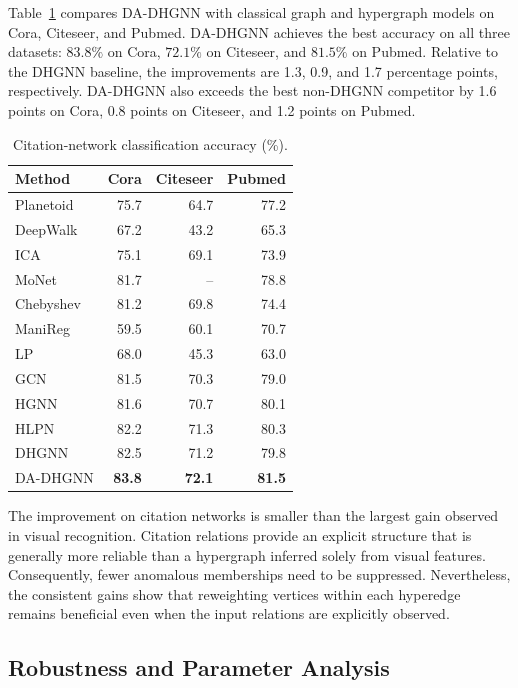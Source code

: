 Table~\ref{tab:citation-main-results} compares DA-DHGNN with classical graph
and hypergraph models on Cora, Citeseer, and Pubmed. DA-DHGNN achieves the best
accuracy on all three datasets: $83.8\%$ on Cora, $72.1\%$ on Citeseer, and
$81.5\%$ on Pubmed. Relative to the DHGNN baseline, the improvements are 1.3,
0.9, and 1.7 percentage points, respectively. DA-DHGNN also exceeds the best
non-DHGNN competitor by 1.6 points on Cora, 0.8 points on Citeseer, and 1.2
points on Pubmed.

\begin{table}[t]
\centering
\caption{Citation-network classification accuracy (\%).}
\label{tab:citation-main-results}
\scriptsize
\begin{tabular}{lrrr}
\toprule
Method & Cora & Citeseer & Pubmed \\
\midrule
Planetoid & 75.7 & 64.7 & 77.2 \\
DeepWalk & 67.2 & 43.2 & 65.3 \\
ICA & 75.1 & 69.1 & 73.9 \\
MoNet & 81.7 & -- & 78.8 \\
Chebyshev & 81.2 & 69.8 & 74.4 \\
ManiReg & 59.5 & 60.1 & 70.7 \\
LP & 68.0 & 45.3 & 63.0 \\
GCN & 81.5 & 70.3 & 79.0 \\
HGNN & 81.6 & 70.7 & 80.1 \\
HLPN & 82.2 & 71.3 & 80.3 \\
DHGNN & 82.5 & 71.2 & 79.8 \\
DA-DHGNN & \textbf{83.8} & \textbf{72.1} & \textbf{81.5} \\
\bottomrule
\end{tabular}
\end{table}

The improvement on citation networks is smaller than the largest gain observed
in visual recognition. Citation relations provide an explicit structure that
is generally more reliable than a hypergraph inferred solely from visual
features. Consequently, fewer anomalous memberships need to be suppressed.
Nevertheless, the consistent gains show that reweighting vertices within each
hyperedge remains beneficial even when the input relations are explicitly
observed.

\subsection{Robustness and Parameter Analysis}

